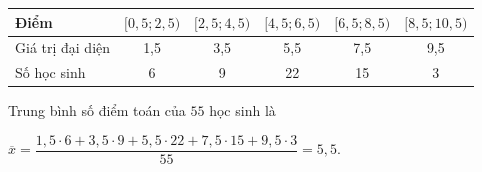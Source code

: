 \begin{ex}
{\begin{enumerate}
\begin{center}
				\begin{tabular}{|l|c|c|c|c|c|}
					\hline Điểm & $[0,5; 2,5) $ & $[2,5;  4,5) $ & $[4,5; 6,5) $ & $[6,5; 8,5) $ & $[8,5; 10,5) $ \\
					\hline Giá trị đại  diện & 1,5 & 3,5 & 5,5 & 7,5 & 9,5 \\
					\hline Số học sinh & 6 & 9 & 22 & 15  & 3 \\
					\hline 
				\end{tabular}
			\end{center}
			 Trung bình số điểm toán của $55$ học sinh là
			\begin{center}
				$\overline{x}=\dfrac{1{,}5\cdot  6+3{,}5\cdot 9+5{,}5\cdot 22+7{,}5\cdot 15+9{,}5\cdot 3}{55}=5{,}5$.
			\end{center}
		\end{enumerate}
	} 
\end{ex}

